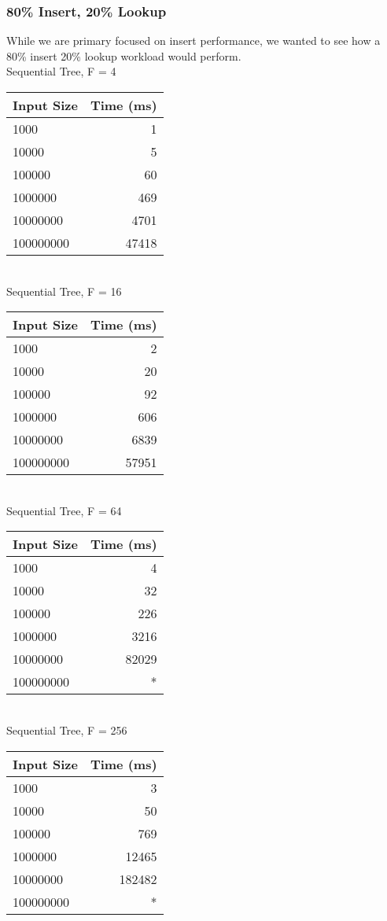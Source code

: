 \documentclass{sig-alternate}
\begin{document}
\subsubsection{80\% Insert, 20\% Lookup}
While we are primary focused on insert performance, we wanted to see how a 80\% insert 20\% lookup workload would perform.\\
Sequential Tree, F = 4\\
\begin{tabular}{| l | r |}
  \hline
  Input Size & Time (ms)\\  \hline
  1000			&	1	\\
  10000			&	5	\\
  100000		&	60	\\
  1000000		&	469	\\
  10000000		&	4701	\\
  100000000		&	47418	\\
  \hline
\end{tabular} \\

Sequential Tree, F = 16\\
\begin{tabular}{| l | r |}
  \hline
  Input Size & Time (ms)\\  \hline
  1000			&	2	\\
  10000			&	20	\\
  100000		&	92	\\
  1000000		&	606	\\
  10000000		&	6839	\\
  100000000		&	57951	\\
  \hline
\end{tabular} \\

Sequential Tree, F = 64\\
\begin{tabular}{| l | r |}
  \hline
  Input Size & Time (ms)\\  \hline
  1000			&	4	\\
  10000			&	32	\\
  100000		&	226	\\
  1000000		&	3216	\\
  10000000		&	82029	\\
  100000000		&	* \\
  \hline
\end{tabular} \\

Sequential Tree, F = 256\\
\begin{tabular}{| l | r |}
  \hline
  Input Size & Time (ms)\\  \hline
  1000			&	3	\\
  10000			&	50	\\
  100000		&	769	\\
  1000000		&	12465	\\
  10000000		&	182482	\\
  100000000		&	*	\\
  \hline
\end{tabular}\\
\end{document}
